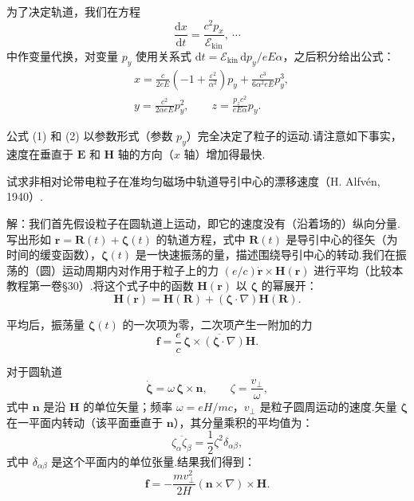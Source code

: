 \begin{xiti}
为了决定轨道，我们在方程
\begin{equation*}
  \frac{\mathrm{d}x}{\mathrm{d}t}=\frac{c^2p_x}{\mathcal{E}_\mathrm{kin}},\ \cdots
\end{equation*}
中作变量代换，对变量 $p_y$ 使用关系式
$\mathrm{d}t=\mathcal{E}_\mathrm{kin}\,\mathrm{d}p_y/eE\alpha$，之后积分给出公式：
\begin{equation*}\tag{2}
\begin{aligned}
  &x=\frac{c}{2eE}\left(-1+\frac{\varepsilon^2}{\alpha^2}\right)p_y
  +\frac{c^3}{6\alpha^2eE}p_y^3,\\
  &y=\frac{c^2}{2\alpha eE}p_y^2,\qquad
  z=\frac{p_zc^2}{eE\alpha}p_y.
\end{aligned}
\end{equation*}

公式 (1) 和 (2) 以参数形式（参数 $p_y$）完全决定了粒子的运动.请注意如下事实，速度在垂直于 $\boldsymbol{E}$ 和
$\boldsymbol{H}$ 轴的方向（$x$ 轴）增加得最快.

\quad 试求非相对论带电粒子在准均匀磁场中轨道导引中心的漂移速度（H. Alfv\'en, 1940）.

解：我们首先假设粒子在圆轨道上运动，即它的速度没有（沿着场的）纵向分量.写出形如
$\boldsymbol{r}=\boldsymbol{R}(t)+\boldsymbol{\zeta}(t)$ 的轨道方程，式中 $\boldsymbol{R}(t)$
是导引中心的径矢（为时间的缓变函数），$\boldsymbol{\zeta}(t)$ 是一快速振荡的量，描述围绕导引中心的转动.我们在振荡的（圆）运动周期内对作用于粒子上的力
$(e/c)\dot{\boldsymbol{r}}\times\boldsymbol{H}(\boldsymbol{r})$ 进行平均（比较本教程第一卷§30）.将这个式子中的函数
$\boldsymbol{H}(\boldsymbol{r})$ 以 $\boldsymbol{\zeta}$ 的幂展开：
\begin{equation*}
  \boldsymbol{H}(\boldsymbol{r})=\boldsymbol{H}(\boldsymbol{R})
  +\left(\boldsymbol{\zeta}\cdot\nabla\right)\boldsymbol{H}(\boldsymbol{R}).
\end{equation*}

平均后，振荡量 $\boldsymbol{\zeta}(t)$ 的一次项为零，二次项产生一附加的力
\begin{equation*}
  \boldsymbol{f}=\frac{e}{c}\,
  \overline{\boldsymbol{\zeta}\times
  \left(\boldsymbol{\zeta}\cdot\nabla\right)\boldsymbol{H}}.
\end{equation*}

对于圆轨道
\begin{equation*}
  \dot{\boldsymbol{\zeta}}=\omega\,\boldsymbol{\zeta}\times\boldsymbol{n},\qquad
  \zeta=\frac{v_\perp}{\omega},
\end{equation*}
式中 $\boldsymbol{n}$ 是沿 $\boldsymbol{H}$ 的单位矢量；频率 $\omega=eH/mc$，$v_\perp$
是粒子圆周运动的速度.矢量 $\boldsymbol{\zeta}$ 在一平面内转动（该平面垂直于 $\boldsymbol{n}$），其分量乘积的平均值为：
\begin{equation*}
  \overline{\zeta_\alpha\zeta_\beta}=\frac{1}{2}\zeta^2\delta_{\alpha\beta},
\end{equation*}
式中 $\delta_{\alpha\beta}$ 是这个平面内的单位张量.结果我们得到：
\begin{equation*}
  \boldsymbol{f}=-\frac{mv_\perp^2}{2H}
  \left(\boldsymbol{n}\times\nabla\right)\times\boldsymbol{H}.
\end{equation*}


\end{xiti}
